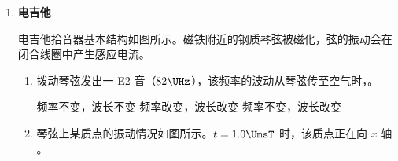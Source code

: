 \documentclass[\gkver]{gaokaozhenti}
\begin{document}
\begin{enumerate}
{正确选项为 AD。

2．（1）匀强电场中电场强度和电势差的关系是 $E=\frac{U}{d}$。

（2）电荷在电场中运动时，电场力做正功，导致电势能减少，可得 $E_{p1} > E_{p2}$；由电路图可知电容器左极板带正电，因此极板间的电场线方向向右，液滴在此区域向左逆电场线方向运动，电势升高，即 $\varphi_{1} < \varphi_{2}$。

正确选项为 D。

（3）电路稳定时两板间电压等于电源电动势，与电阻无关，A、B 选项错误；

液滴在竖直方向做自由落体运动，若电容器整体上移，则在板间运动的时间 $t$ 变大，离开电场的竖直速度 $v_{y}$ 减小；水平方向做匀加速运动，水平距离 $x=\frac{1}{2}a_{x}t^{2}$、水平速度 $v_{x}=a_{x}t$ 也随之变大，与竖直方向的夹角 $\tan\theta=\frac{v_{x}}{v_{y}}$ 也增大，使液滴离开电场后会比之前更偏向左运动，能落至 $b$ 点。选项 C 正确 D 错误。

电容器右极板向左移动，两板间距离减小，导致水平方向加速度 $a_{x}=\frac{qU}{md}$ 增大，水平距离 $x$、与竖直方向的夹角 $\tan\theta$ 都增大，使液滴离开电场后会比之前更偏向左运动，能落至 $b$ 点。选项 E 正确 F 错误。

正确选项为 CE。

（4）根据玻尔理论的频率条件，两个能级的能量差 $\Delta E=h\nu=\frac{hc}{\lambda}$。

3．根据德布罗意波长公式，氦原子的物质波波长 $\lambda=\frac{h}{p}=\frac{h}{mv}$，由 $\frac{h}{mv}<\lambda$ 解得速度 $v>\frac{h}{m\lambda}$。

正确选项为 C。
}

\item
\textbf{电吉他}

电吉他拾音器基本结构如图所示。磁铁附近的钢质琴弦被磁化，弦的振动会在闭合线圈中产生感应电流。

\onepicture[align=right, h=3.50cm]{}
\begin{enumerate}
	\item
	拨动琴弦发出一 E2 音（$82 \UHz$），该频率的波动从琴弦传至空气时，。

	{频率不变，波长不变}
	{频率改变，波长改变}
	{频率不变，波长改变}

	\item
	琴弦上某质点的振动情况如图所示。$t=1.0 \UmsT$ 时，该质点正在向 $x$ 轴 。


\end{enumerate}
\end{enumerate}
\end{document}
